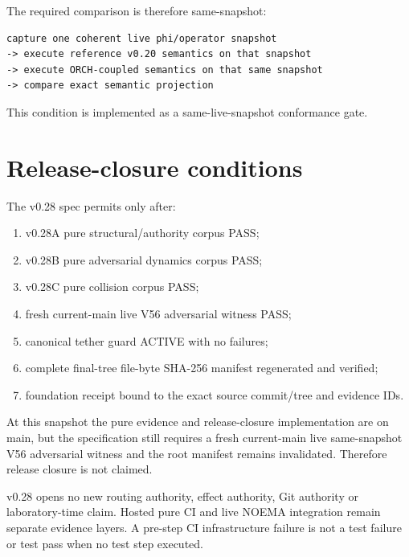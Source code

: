 The required comparison is therefore same-snapshot:
\begin{lstlisting}
capture one coherent live phi/operator snapshot
-> execute reference v0.20 semantics on that snapshot
-> execute ORCH-coupled semantics on that same snapshot
-> compare exact semantic projection
\end{lstlisting}
This condition is implemented as a same-live-snapshot conformance gate.

\section{Release-closure conditions}
The v0.28 spec permits  only after:
\begin{enumerate}
\item v0.28A pure structural/authority corpus PASS;
\item v0.28B pure adversarial dynamics corpus PASS;
\item v0.28C pure collision corpus PASS;
\item fresh current-main live V56 adversarial witness PASS;
\item canonical tether guard ACTIVE with no failures;
\item complete final-tree file-byte SHA-256 manifest regenerated and verified;
\item foundation receipt bound to the exact source commit/tree and evidence IDs.
\end{enumerate}
At this snapshot the pure evidence and release-closure implementation are on main, but the specification still requires a fresh current-main live same-snapshot V56 adversarial witness and the root manifest remains invalidated. Therefore release closure is not claimed.

\begin{boundarybox}
v0.28 opens no new routing authority, effect authority, Git authority or laboratory-time claim. Hosted pure CI and live NOEMA integration remain separate evidence layers. A pre-step CI infrastructure failure is not a test failure or test pass when no test step executed.
\end{boundarybox}
